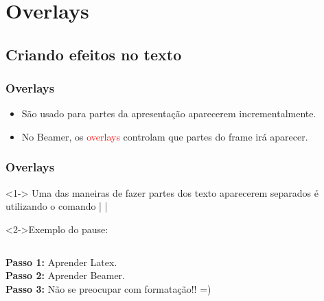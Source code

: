 \section{Overlays}
\subsection{Criando efeitos no texto}


\begin{frame}
  \frametitle{Overlays}

  \begin{itemize}[<+->]
     \item São usado para partes da apresentação aparecerem incrementalmente.
     \item No Beamer, os \textcolor{red}{overlays} controlam que partes do frame irá aparecer.
  \end{itemize}

\end{frame}


\begin{frame}[fragile]
  \frametitle{Overlays}

  \begin{block}<1->{}
    Uma das maneiras de fazer partes dos texto aparecerem separados é utilizando o comando
    | \pause |
  \end{block}

  \begin{block}<2->{Exemplo do pause:}
    \inputminted[fontsize=\scriptsize]{tex}{codes/08-pause-command.tex}
  \end{block}

  \begin{block}{}
     \pause
     \textbf{Passo 1:} Aprender Latex. \\
     \pause
     \textbf{Passo 2:} Aprender Beamer. \\
     \pause
     \textbf{Passo 3:} Não se preocupar com formatação!! =) \\
  \end{block}

\end{frame}


